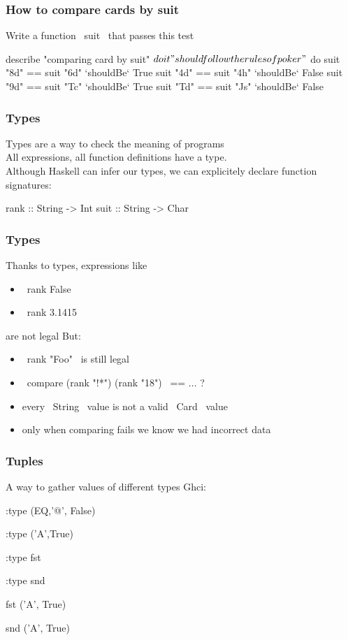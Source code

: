 \documentclass[11pt,xcolor={dvipsnames}]{beamer}
\newcommand{\tc}{\textcolor}
\newcommand{\key}[1]{\tc{orange}{#1}}
\newcommand{\rk}{\enskip{\key{$\hookleftarrow$}}}
\newcommand{\vs}{\vspace{1em}}
\begin{document}
\begin{frame}[fragile]
\frametitle{How to compare cards by suit}
Write a function ~suit~ that passes this test
\vs
\begin{hspec}
describe "comparing card by suit" $ do
    it "should follow the rules of poker" $ do
        suit "8d" == suit "6d" `shouldBe` True
        suit "4d" == suit "4h" `shouldBe` False
        suit "9d" == suit "Tc" `shouldBe` True
        suit "Td" == suit "Js" `shouldBe` False
\end{hspec}
\end{frame}
\begin{frame}[fragile]
\frametitle{Types}
Types are a way to check the meaning of programs\\
All expressions, all function definitions have a type.\\
Although Haskell can infer our types, we can explicitely declare function signatures:
\vs
\begin{haskell}
rank :: String -> Int
suit :: String -> Char
\end{haskell}
\end{frame}
\begin{frame}[fragile]
\frametitle{Types}
Thanks to types, expressions like
\begin{itemize}
\item  ~rank False~ 
\item  ~rank 3.1415~ 
\end{itemize}
are not legal
\vs
But:
\begin{itemize}
\item  ~rank "Foo"~ is still legal
\item  ~compare (rank "!*") (rank "18")~ == ... ?
\item  every ~String~ value is not a valid ~Card~ value
\item  only when comparing fails we know we had incorrect data
\end{itemize}
\end{frame}
\begin{frame}[fragile]
\frametitle{Tuples}
A way to gather values of different types
\vs
Ghci:
\begin{term}
:type (EQ,'@', False)\rk

:type ('A',True)\rk

:type fst\rk

:type snd\rk

fst ('A', True)\rk

snd ('A', True) \rk
\end{term}
\end{frame}
\end{document}
